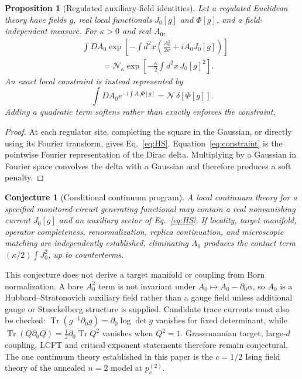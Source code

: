 \documentclass[aps,prx,reprint,superscriptaddress,nobibnotes,longbibliography]{revtex4-2}
\newtheorem{proposition}{Proposition}
\newtheorem{conjecture}{Conjecture}
\theoremstyle{remark}
\newcommand{\Tr}{\operatorname{Tr}}
\begin{document}
\begin{proposition}[Regulated auxiliary-field identities]
\label{thm:aux}
Let a regulated Euclidean theory have fields $g$, real local functionals $J_0[g]$ and $\Phi[g]$, and a field-independent measure.  For $\kappa>0$ and real $A_0$,
\begin{align}
 &\int DA_0\exp\left[-\int d^2x\left(\frac{A_0^2}{2\kappa}+iA_0J_0[g]\right)\right]\nonumber\\
 &\hspace{1cm}=\mathcal N_\kappa\exp\left[-\frac\kappa2\int d^2x\,J_0[g]^2\right].
 \label{eq:HS}
\end{align}
An exact local constraint is instead represented by
\begin{equation}
 \int DA_0e^{-i\int A_0\Phi[g]}=\mathcal N\,\delta[\Phi[g]].
 \label{eq:constraint}
\end{equation}
Adding a quadratic term softens rather than exactly enforces the constraint.
\end{proposition}

\begin{proof}
At each regulator site, completing the square in the Gaussian, or directly using its Fourier transform, gives Eq.~\eqref{eq:HS}.  Equation~\eqref{eq:constraint} is the pointwise Fourier representation of the Dirac delta.  Multiplying by a Gaussian in Fourier space convolves the delta with a Gaussian and therefore produces a soft penalty.
\end{proof}

\begin{conjecture}[Conditional continuum program]
A local continuum theory for a specified monitored-circuit generating functional may contain a real nonvanishing current $J_0[g]$ and an auxiliary sector of Eq.~\eqref{eq:HS}.  If locality, target manifold, operator completeness, renormalization, replica continuation, and microscopic matching are independently established, eliminating $A_0$ produces the contact term $(\kappa/2)\int J_0^2$, up to counterterms.
\end{conjecture}

This conjecture does not derive a target manifold or coupling from Born normalization.  A bare $A_0^2$ term is not invariant under $A_0\mapsto A_0-\partial_0\alpha$, so $A_0$ is a Hubbard--Stratonovich auxiliary field rather than a gauge field unless additional gauge or Stueckelberg structure is supplied.  Candidate trace currents must also be checked: $\Tr(g^{-1}\partial_0g)=\partial_0\log\det g$ vanishes for fixed determinant, while $\Tr(Q\partial_0Q)=\tfrac12\partial_0\Tr Q^2$ vanishes when $Q^2=1$.  Grassmannian target, large-$d$ coupling, LCFT and critical-exponent statements therefore remain conjectural.  The one continuum theory established in this paper is the $c=1/2$ Ising field theory of the annealed $n=2$ model at $p_c^{(2)}$.
\end{document}
